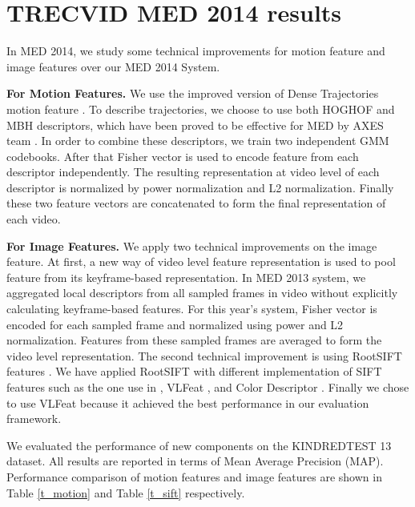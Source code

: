 
\chapter{TRECVID MED 2014 results}

\ifpdf
\graphicspath{{Appendix2/Figs/Raster/}{Appendix2/Figs/PDF/}{Appendix2/Figs/}}
\else
\graphicspath{{Appendix2/Figs/Vector/}{Appendix2/Figs/}}
\fi

In MED 2014, we study some technical improvements for motion feature and image features over our MED 2014 System.

\textbf{For Motion Features.} We use the improved version of Dense Trajectories motion feature \cite{Wang2013}. To describe trajectories, we choose to use both HOGHOF and MBH descriptors, which have been proved to be effective for MED by AXES team \cite{aly2013axes}. In order to combine these descriptors, we train two independent GMM codebooks. After that Fisher vector is used to encode feature from each descriptor independently. The resulting representation at video level of each descriptor is normalized by power normalization and L2 normalization. Finally these two feature vectors are concatenated to form the final representation of each video.

\textbf{For Image Features.} We apply two technical improvements on the image feature. At first, a new way of video level feature representation is used to pool feature from its keyframe-based representation. In MED 2013 system, we aggregated local descriptors from all sampled frames in video without explicitly calculating keyframe-based features. For this year's system, Fisher vector is encoded for each sampled frame and normalized using power and L2 normalization. Features from these sampled frames are averaged to form the video level representation. The second technical improvement is using RootSIFT features \cite{arandjelovic2012three}. We have applied RootSIFT with different implementation of SIFT features such as the one use in \cite{mikolajczyk2005performance}, VLFeat \cite{vedaldi08vlfeat}, and Color Descriptor \cite{vandeSandeTPAMI2010}. Finally we chose to use VLFeat because it achieved the best performance in our evaluation framework.

We evaluated the performance of new components on the KINDREDTEST 13 dataset. All results are reported in terms of Mean Average Precision (MAP). Performance comparison of motion features and image features are shown in Table \ref{t_motion} and Table \ref{t_sift} respectively. 


